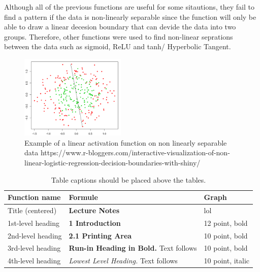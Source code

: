 \documentclass[runningheads]{llncs}
\begin{document}
Although all of the previous functions are useful for some sitautions, 
they fail to find a pattern if the data is non-linearly separable
since the function will only be able to draw a linear decesion boundary that can devide the data into two groups.
Therefore, other functions were used to find non-linear seprations between the data such as sigmoid, ReLU and tanh/ Hyperbolic Tangent. 

\begin{figure}
    \includegraphics[height=4cm]{linear}
    \caption{Example of a linear activation function on non linearly separable data
    https://www.r-bloggers.com/interactive-visualization-of-non-linear-logistic-regression-decision-boundaries-with-shiny/}
\end{figure}

\begin{table}
    \caption{Table captions should be placed above the
    tables.}\label{tab1}
    \begin{tabular}{|l|l|l|}
    \hline
    Function name &  Formule & Graph\\
    \hline
    Title (centered) &  {\Large\bfseries Lecture Notes} & lol \\
    1st-level heading &  {\large\bfseries 1 Introduction} & 12 point, bold\\
    2nd-level heading & {\bfseries 2.1 Printing Area} & 10 point, bold\\
    3rd-level heading & {\bfseries Run-in Heading in Bold.} Text follows & 10 point, bold\\
    4th-level heading & {\itshape Lowest Level Heading.} Text follows & 10 point, italic\\
    \hline
    \end{tabular}
\end{table}
\end{document}
